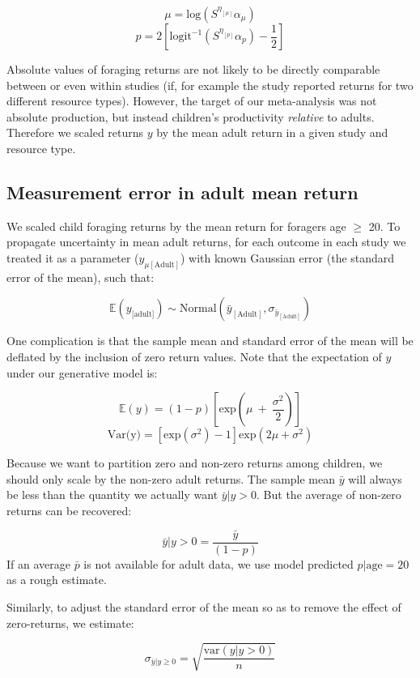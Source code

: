 \documentclass[
]{article}
\begin{document}
\[ \mu = \textrm{log}(S^{\eta_{[\mu]}}\alpha_{\mu}) \]
\[ p = 2[\textrm{logit}^{-1}(S^{\eta_{[p]}}\alpha_{p}) - \frac{1}{2}] \]

Absolute values of foraging returns are not likely to be directly
comparable between or even within studies (if, for example the study
reported returns for two different resource types). However, the target
of our meta-analysis was not absolute production, but instead children's
productivity \emph{relative} to adults. Therefore we scaled returns
\(y\) by the mean adult return in a given study and resource type.

\hypertarget{measurement-error-in-adult-mean-return}{%
\subsection{Measurement error in adult mean
return}\label{measurement-error-in-adult-mean-return}}

We scaled child foraging returns by the mean return for foragers age
\(\geq\) 20. To propagate uncertainty in mean adult returns, for each
outcome in each study we treated it as a parameter
(\(y_{\mu[\textrm{Adult}]}\)) with known Gaussian error (the standard
error of the mean), such that:

\[ \mathbb{E}(y_{\textrm{[adult]}}) \sim \textrm{Normal}(\bar{y}_{[\textrm{Adult}]},\sigma_{\bar{y}_{[\textrm{Adult}]}}) \]

One complication is that the sample mean and standard error of the mean
will be deflated by the inclusion of zero return values. Note that the
expectation of \(y\) under our generative model is:

\[ \mathbb{E}(y) = (1 - p)[\textrm{exp}(\mu~+~\frac{\sigma^2}{2})] \]
\[ \textrm{Var(y)} = [\textrm{exp}(\sigma^2) - 1] \textrm{exp}(2\mu + \sigma^2) \]

Because we want to partition zero and non-zero returns among children,
we should only scale by the non-zero adult returns. The sample mean
\(\bar{y}\) will always be less than the quantity we actually want
\(\bar{y}|y>0\). But the average of non-zero returns can be recovered:

\[\bar{y}|y>0 = \frac{\bar{y}}{(1 - p)}\] If an average \(\bar{p}\) is
not available for adult data, we use model predicted
\(p|\textrm{age} = 20\) as a rough estimate.

Similarly, to adjust the standard error of the mean so as to remove the
effect of zero-returns, we estimate:

\[ \sigma_{\bar{y}|y \geq 0} = \sqrt{\frac{\textrm{var}(y|y >0)}{n}}\]
\end{document}
